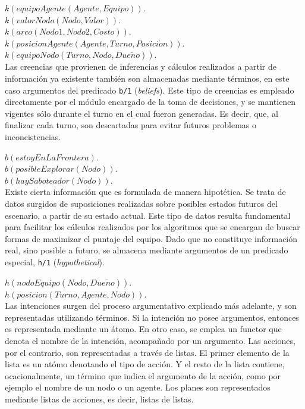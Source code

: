 \documentclass[oneside]{book}
\theoremstyle{definition}
\newcommand{\lit}[1]{\mbox{$ #1$}}
\begin{document}
\vspace*{1em}
\noindent\lit{k(equipoAgente(Agente, Equipo)).}\\
\lit{k(valorNodo(Nodo, Valor)).}\\
\lit{k(arco(Nodo1, Nodo2, Costo)).}\\
\lit{k(posicionAgente(Agente, Turno, Posici\acute{o}n)).}\\
\lit{k(equipoNodo(Turno, Nodo, Due\tilde{n}o)).}\\


Las creencias que provienen de inferencias y cálculos realizados a partir de información 
ya existente también son almacenadas mediante términos, en este caso argumentos del 
predicado \texttt{b/1} (\textit{beliefs}). Este tipo de creencias es empleado directamente 
por el módulo encargado de la toma de decisiones, y se mantienen vigentes sólo durante el 
turno en el cual fueron generadas. Es decir, que, al finalizar cada turno, son descartadas 
para evitar futuros problemas o inconcistencias.

\vspace*{1em}
\noindent\lit{b(estoyEnLaFrontera).}\\
\lit{b(posibleExplorar(Nodo)).}\\
\lit{b(haySaboteador(Nodo)).}\\


Existe cierta información que es formulada de manera hipotética. Se trata de datos 
surgidos de suposiciones realizadas sobre posibles estados futuros del escenario, a partir 
de su estado actual. Este tipo de datos resulta fundamental para facilitar los cálculos 
realizados por los algoritmos que se encargan de buscar formas de maximizar el puntaje 
del equipo. Dado que no constituye información real, sino posible a futuro, se almacena 
mediante argumentos de un predicado especial, \texttt{h/1} (\textit{hypothetical}).

\vspace*{1em}
\noindent\lit{h(nodoEquipo(Nodo, Due\tilde{n}o)).}\\
\lit{h(posicion(Turno, Agente, Nodo)).}\\


Las intenciones surgen del proceso argumentativo explicado más adelante, y son 
representadas utilizando términos. Si la intención no posee argumentos, entonces es 
representada mediante un átomo. En otro caso, se emplea un functor que denota el 
nombre de la intención, acompañado por un argumento. Las acciones, por el contrario, 
son representadas a través de listas. El primer elemento de la lista es un atómo denotando 
el tipo de acción. Y el resto de la lista contiene, ocacionalmente, un término que 
indica el argumento de la acción, como por ejemplo el nombre de un nodo o un agente.
Los planes son representados mediante listas de acciones, es decir, listas de listas.
\end{document}
